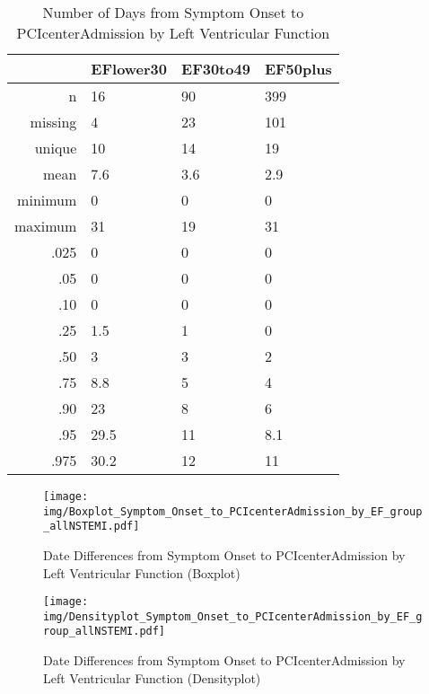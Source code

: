 \documentclass[a4paper]{report}
\begin{document}
\begin{itemize}
{%
\begin{table}[ht]
\centering
\begin{tabular}{rlll}
  \toprule
 & EFlower30 & EF30to49 & EF50plus \\ 
  \midrule
n & 16 & 90 & 399 \\ 
  missing & 4 & 23 & 101 \\ 
  unique & 10 & 14 & 19 \\ 
  mean & 7.6 & 3.6 & 2.9 \\ 
  minimum & 0 & 0 & 0 \\ 
  maximum & 31 & 19 & 31 \\ 
  .025 & 0 & 0 & 0 \\ 
  .05 & 0 & 0 & 0 \\ 
  .10 & 0 & 0 & 0 \\ 
  .25 & 1.5 & 1 & 0 \\ 
  .50 & 3 & 3 & 2 \\ 
  .75 & 8.8 & 5 & 4 \\ 
  .90 & 23 & 8 & 6 \\ 
  .95 & 29.5 & 11 & 8.1 \\ 
  .975 & 30.2 & 12 & 11 \\ 
   \bottomrule
\end{tabular}
\caption{Number of Days from Symptom Onset to PCIcenterAdmission by Left Ventricular Function} 
\end{table}
\begin{figure}
  \centering
  \caption{Date Differences from Symptom Onset to PCIcenterAdmission by Left Ventricular Function (Boxplot)}
  \label{Boxplot: Date Differences from Symptom Onset to PCIcenterAdmission by Left Ventricular Function}
\texttt{[image: img/Boxplot\_Symptom\_Onset\_to\_PCIcenterAdmission\_by\_EF\_group\_allNSTEMI.pdf]}\end{figure}


\begin{figure}
  \centering
  \caption{Date Differences from Symptom Onset to PCIcenterAdmission by Left Ventricular Function (Densityplot)}
  \label{Density: Date Differences from Symptom Onset to PCIcenterAdmission by Left Ventricular Function}
\texttt{[image: img/Densityplot\_Symptom\_Onset\_to\_PCIcenterAdmission\_by\_EF\_group\_allNSTEMI.pdf]}\end{figure}


\clearpage

}
\end{itemize}
\end{document}
